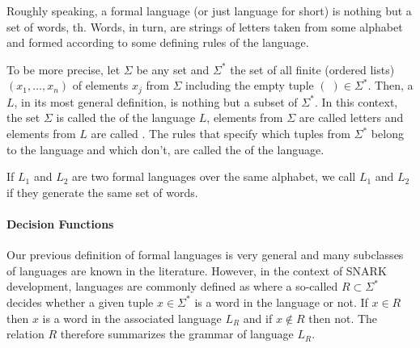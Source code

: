 Roughly speaking, a formal language (or just language for short) is nothing but a set of words, th. Words, in turn, are strings of letters taken from some alphabet and formed according to some defining rules of the language. 

To be more precise, let $\Sigma$ be any set and $\Sigma^*$ the set of all finite  (ordered lists) $(x_1,\ldots,x_n)$ of elements $x_j$ from $\Sigma$ including the empty tuple $(\;)\in \Sigma^*$. Then, a  $L$, in its most general definition, is nothing but a subset of $\Sigma^*$. In this context, the set $\Sigma$ is called the  of the language $L$, elements from $\Sigma$ are called letters and elements from $L$ are called . The rules that specify which tuples from $\Sigma^*$ belong to the language and which don't, are called the  of the language. 

If $L_1$ and $L_2$ are two formal languages over the same alphabet, we call $L_1$ and $L_2$  if they generate the same set of words. 

\paragraph{Decision Functions} Our previous definition of formal languages is very general and many subclasses of languages  are known in the literature. However,  in the context of SNARK development, languages are commonly defined as  where a so-called  $R\subset \Sigma^*$ decides whether a given tuple $x\in \Sigma^*$ is a word in the language or not. If $x\in R$ then $x$ is a word in the associated language $L_R$ and if $x\notin R$ then not. The relation $R$ therefore summarizes the grammar of language $L_R$.

